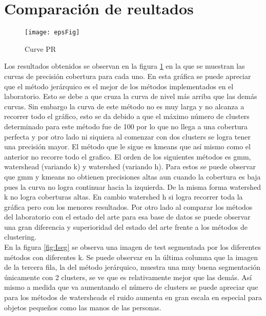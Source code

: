 \documentclass[10pt,twocolumn,letterpaper]{article}
\begin{document}
\section{Comparación de reultados}
\begin{figure}[t]
    \centering
    \texttt{[image: epsFig]}
    \caption{Curve PR}
\label{fig:PR}
\end{figure} 

Los resultados obtenidos se observan en la figura \ref{fig:PR} en la que se muestran las curvas de precisión cobertura para cada uno. En esta gráfica se puede apreciar que el método jerárquico es el mejor de los métodos implementados en el laboratorio. Esto se debe a que cruza la curva de nivel más arriba que las demás curvas. Sin embargo la curva de este método no es muy larga y no alcanza a recorrer todo el gráfico, esto se da debido a que el máximo número de clusters determinado para este método fue de 100 por lo que no llega a una cobertura perfecta y por otro lado ni siquiera al comenzar con dos clusters se logra tener una precisión mayor.  El método que le sigue es kmeans que así mismo como el anterior no recorre todo el grafico. El orden de los siguientes métodos es gmm, watershead (variando k) y watershed (variando h). Para estos se puede observar que gmm y kmeans no obtienen precisiones altas aun cuando la cobertura es baja pues la curva no logra continuar hacia la izquierda. De la misma forma watershed k no logra coberturas altas. En cambio watershed h si logra recorrer toda la gráfica pero con los menores resultados. Por otro lado al comparar los métodos del laboratorio con el estado del arte para esa base de datos se puede observar una gran diferencia y superioridad del estado del arte frente a los métodos de clustering.
\\
En la figura \ref{fig:Iseg} se observa una imagen de test segmentada por los diferentes métodos con diferentes k. Se puede observar en la última columna que la imagen de la tercera fila, la del método jerárquico, muestra una muy buena segmentación únicamente con 2 clusters, se ve que es relativamente mejor que las demás. Así mismo a medida que va aumentando el número de clusters se puede apreciar que para los métodos de watersheads el ruido aumenta en gran escala en especial para objetos pequeños como las manos de las personas. 

\end{document}
